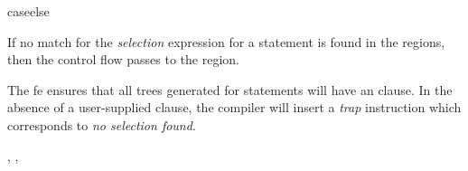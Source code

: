 \begin{instruction}{caseelse}

  \begin{notes}
    If no match for the \emph{selection} expression for a 
    statement is found in the  regions, then the
    control flow passes to the  region.

    The \ac{fe} ensures that all trees generated for 
    statements will have an  clause.  In the absence of a
    user-supplied  clause, the compiler will insert a
    \emph{trap} instruction which corresponds to \emph{no selection
      found}.
  \end{notes}

  \nresults

  \begin{operands}
  \item {}
  \end{operands}

  \begin{seealso}
    , ,
  \end{seealso}
\end{instruction}

